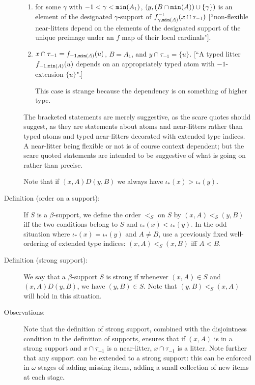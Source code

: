 \documentclass[112pt]{article}
\begin{document}
\begin{description}
\begin{enumerate}
\item for some $\gamma$ with $-1 < \gamma<{\tt min}(A_1)$, $(y,(B\cap {\tt min}(A)) \cup \{\gamma\})$ is an element of the designated $\gamma$-support of $f_{\gamma,{\tt min}(A)}^{-1}(x \cap \tau_{-1})$ [``non-flexible near-litters depend on the elements of the designated support of the unique preimage under an $f$ map of their local cardinals"].

\item $x \cap \tau_{-1}= f_{-1,{\tt min}(A)}(u)$, $B= A_1$, and $y \cap \tau_{-1}= \{u\}$.  [``A typed litter $f_{-1,{\tt min}(A)}(u)$ depends on an appropriately typed atom with $-1$-extension $\{u\}$".]

This case is strange because the dependency is on something of higher type.

\end{enumerate}

The bracketed statements are merely suggestive, as the scare quotes should suggest, as they are statements about atoms and near-litters rather than typed atoms and typed near-litters decorated with extended type indices.  A near-litter being flexible or not is of course context dependent;  but the scare quoted statements are intended to be suggestive of what is going on rather than precise.

Note that if $(x,A) D (y,B)$ we always have $\iota_*(x)>\iota_*(y)$.

\item[Definition (order on a support):]  If $S$ is a $\beta$-support, we define the order $<_S$ on $S$ by $(x,A) <_S (y,B)$ iff the two conditions belong to $S$ and
$\iota_*(x)<\iota_*(y)$.  In the odd situation where $\iota_*(x)=\iota_*(y)$ and $A \neq B$, use a previously fixed well-ordering of extended type indices:  $(x,A) <_S (x,B)$ iff $A < B$.

\item[Definition (strong support):]  We say that a $\beta$-support $S$ is strong if whenever $(x,A) \in S$ and $(x,A) D (y,B)$, we have $(y,B)\in S$.  Note that $(y,B) <_S (x,A)$ will hold in this situation.  

\item[Observations:]  Note that the definition of strong support, combined with the disjointness condition in the definition of supports, ensures that
if $(x,A)$ is in a strong support and $x \cap \tau_{-1}$ is a near-litter, $x \cap \tau_{-1}$ is a litter.  Note further that any support can be extended to a strong support:  this can be enforced in $\omega$ stages of adding missing items, adding a small collection of new items at each stage.


\end{description}
\end{document}
